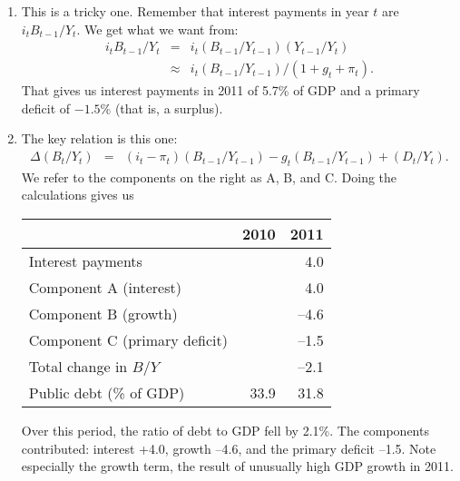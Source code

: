 \begin{enumerate}
\begin{enumerate}
\item This is a tricky one.
Remember that interest payments in year $t$ are $ i_t B_{t-1}/Y_t$.
We get what we want from:
\begin{eqnarray*}
    i_t B_{t-1}/ Y_{t} &=& i_t (B_{t-1}/ Y_{t-1}) (Y_{t-1}/ Y_{t}) \\
           &\approx&  i_t (B_{t-1}/Y_{t-1}) /(1+g_t + \pi_t) .
\end{eqnarray*}
That gives us interest payments in 2011 of 5.7\% of GDP and
a primary deficit of $-1.5$\% (that is, a surplus).

\item The key relation is this one:
\begin{eqnarray*}
    \Delta ({B_{t}}/{Y_{t}})
            &=&
                (i_t-\pi_t) ({B_{t-1}}/{Y_{t-1}})
                - g_t ({B_{t-1}}/{Y_{t-1}})
             +    ({D_{t}}/{Y_{t}})  .
\end{eqnarray*}
We refer to the components on the right as A, B, and C.
Doing the calculations gives us

\begin{center}
\begin{tabular}{lrr}
\toprule
        &  2010 & 2011   \\
\midrule
Interest payments  &  &  4.0  \\
Component A (interest)  &  &  4.0  \\
Component B (growth)            &   & --4.6  \\
Component C (primary deficit)   &   & --1.5  \\
Total change in $B/Y$       &       & --2.1   \\
Public debt (\% of GDP)     &  33.9 & 31.8   \\
\bottomrule
\end{tabular}
\end{center}

Over this period, the ratio of debt to GDP fell by 2.1\%.
The components contributed:
interest +4.0, growth --4.6, and the primary deficit --1.5.
Note especially the growth term, the result of unusually high GDP growth in 2011.


\end{enumerate}
\end{enumerate}
